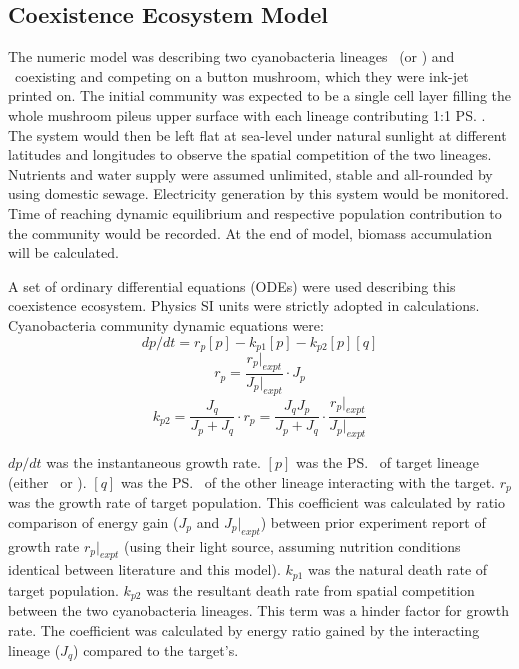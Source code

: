 \documentclass[../thesis.tex]{subfiles} %
\begin{document}
\subsection{Coexistence Ecosystem Model}

The numeric model was describing two cyanobacteria lineages \As\ (or \Ss) and \Cs\ coexisting and competing on a button mushroom,\autocite{joshi2018bacterial} which they were ink-jet printed on.  The initial community was expected to be a single cell layer filling the whole mushroom pileus upper surface with each lineage contributing 1:1 \ps.  The system would then be left flat at sea-level under natural sunlight at different latitudes and longitudes to observe the spatial competition of the two lineages.  Nutrients and water supply were assumed unlimited, stable and all-rounded by using domestic sewage.\autocite{markou2014microalgal}  Electricity generation by this system would be monitored.  Time of reaching dynamic equilibrium and respective population contribution to the community would be recorded.  At the end of model, biomass accumulation will be calculated.

A set of ordinary differential equations (ODEs) were used describing this coexistence ecosystem.  Physics SI units were strictly adopted in calculations.  Cyanobacteria community dynamic equations were:
\begin{equation}\label{eq:main}
    dp/dt = r_p [p] - k_{p1} [p] - k_{p2} [p][q]
\end{equation}
\begin{equation}\label{eq:growth}
    r_p = \dfrac{r_p|_{expt}}{J_p|_{expt}}\cdot J_p
\end{equation}
\begin{equation}\label{eq:compete}
    k_{p2} = \dfrac{J_q}{J_p + J_q}\cdot r_p = \dfrac{J_q J_p}{J_p + J_q}\cdot \dfrac{r_p|_{expt}}{J_p|_{expt}}
\end{equation}

$dp/dt$ was the instantaneous growth rate.  $[p]$ was the \ps\ of target lineage (either \As\ or \Cs).  $[q]$ was the \ps\ of the other lineage interacting with the target.  $r_p$ was the growth rate of target population.  This coefficient was calculated by ratio comparison of energy gain ($J_p$ and $J_p|_{expt}$) between prior experiment report of growth rate $r_p|_{expt}$ (using their light source, assuming nutrition conditions identical between literature and this model).  $k_{p1}$ was the natural death rate of target population.  $k_{p2}$ was the resultant death rate from spatial competition between the two cyanobacteria lineages.  This term was a hinder factor for growth rate.  The coefficient was calculated by energy ratio gained by the interacting lineage ($J_q$) compared to the target's.
\end{document}
